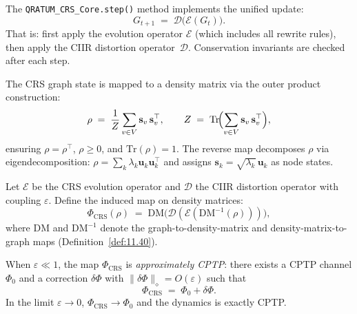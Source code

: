 \begin{definition}
\label{def:11.39}
The \texttt{QRATUM\_CRS\_Core.step()} method implements the unified
update:
\begin{equation}
\label{eq:11.unified}
  G_{t+1}
  \;=\;
  \mathcal{D}\!\bigl(\mathcal{E}(G_t)\bigr).
\end{equation}
That is: first apply the evolution operator $\mathcal{E}$ (which
includes all rewrite rules), then apply the CIIR distortion
operator~$\mathcal{D}$.  Conservation invariants are checked after
each step.
\end{definition}

\begin{definition}
\label{def:11.40}
The CRS graph state is mapped to a density matrix via the outer
product construction:
\begin{equation}
\label{eq:11.density_matrix}
  \rho
  \;=\;
  \frac{1}{Z}
  \sum_{v \in V}
  \mathbf{s}_v \, \mathbf{s}_v^\top,
  \qquad
  Z \;=\; \mathrm{Tr}\!\Bigl(
    \sum_{v \in V} \mathbf{s}_v \, \mathbf{s}_v^\top
  \Bigr),
\end{equation}
ensuring $\rho = \rho^\top$, $\rho \geq 0$, and
$\mathrm{Tr}(\rho) = 1$.  The reverse map decomposes $\rho$ via
eigendecomposition: $\rho = \sum_k \lambda_k
\mathbf{u}_k \mathbf{u}_k^\top$ and assigns $\mathbf{s}_k =
\sqrt{\lambda_k}\,\mathbf{u}_k$ as node states.
\end{definition}

\begin{theorem}
\label{thm:11.10}
Let $\mathcal{E}$ be the CRS evolution operator and $\mathcal{D}$ the
CIIR distortion operator with coupling $\varepsilon$.  Define the
induced map on density matrices:
\[
  \Phi_{\mathrm{CRS}}(\rho)
  \;=\;
  \mathrm{DM}\!\bigl(\mathcal{D}(\mathcal{E}(
    \mathrm{DM}^{-1}(\rho)))\bigr),
\]
where $\mathrm{DM}$ and $\mathrm{DM}^{-1}$ denote the
graph-to-density-matrix and density-matrix-to-graph maps
(Definition~\ref{def:11.40}).

When $\varepsilon \ll 1$, the map $\Phi_{\mathrm{CRS}}$ is
\emph{approximately CPTP}: there exists a CPTP channel $\Phi_0$ and
a correction $\delta\Phi$ with
$\|\delta\Phi\|_{\diamond} = O(\varepsilon)$ such that
\begin{equation}
\label{eq:11.cptp}
  \Phi_{\mathrm{CRS}}
  \;=\;
  \Phi_0 + \delta\Phi.
\end{equation}
In the limit $\varepsilon \to 0$,
$\Phi_{\mathrm{CRS}} \to \Phi_0$ and the dynamics is exactly CPTP.
\end{theorem}

